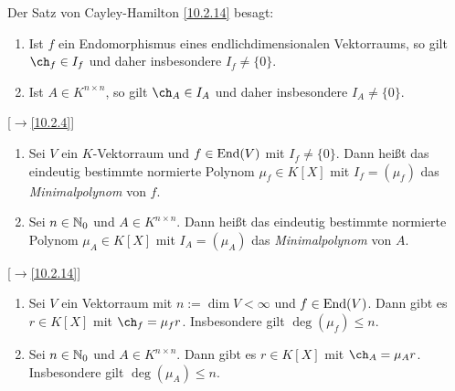 \documentclass[../../main.tex]{subfiles}
\begin{document}
\begin{bem}\label{10.2.17}
Der Satz von Cayley-Hamilton \ref{10.2.14} besagt:
\begin{enumerate}[\normalfont(a)]
\item Ist $f$ ein Endomorphismus eines endlichdimensionalen Vektorraums, so gilt $\ch_f\in I_f$ und daher insbesondere $I_f\ne\{0\}$.
\item Ist $A\in K^{n\times n}$, so gilt $\ch_A\in I_A$ und daher insbesondere $I_A\ne\{0\}$.
\end{enumerate}
\end{bem}

\begin{df}\mbox{}[$\to$\ref{10.2.4}]\label{10.2.18}
\begin{enumerate}[\normalfont(a)]
\item Sei $V$ ein $K$-Vektorraum und $f\in\operatorname{End}(V)$ mit $I_f\ne\{0\}$. Dann heißt das eindeutig bestimmte normierte Polynom $\mu_f\in K[X]$ mit $I_f=(\mu_f)$ das
\emph{Minimalpolynom} von $f$.
\item Sei $n\in\mathbb N_0$ und $A\in K^{n\times n}$. Dann heißt das eindeutig bestimmte normierte Polynom $\mu_A\in K[X]$ mit $I_A=(\mu_A)$ das
\emph{Minimalpolynom} von $A$.
\end{enumerate}
\end{df}

\begin{bem}\mbox{}{\rm[$\to$\ref{10.2.14}]}\label{10.2.19}
\begin{enumerate}[\rm(a)]
\item Sei $V$ ein Vektorraum mit $n:=\dim V<\infty$ und $f\in\operatorname{End}(V)$. Dann gibt es $r\in K[X]$ mit $\ch_f=\mu_fr$. Insbesondere gilt
$\deg(\mu_f)\le n$.
\item Sei $n\in\mathbb N_0$ und $A\in K^{n\times n}$. Dann gibt es $r\in K[X]$ mit $\ch_A=\mu_Ar$. Insbesondere gilt $\deg(\mu_A)\le n$.
\end{enumerate}
\end{bem}
\end{document}

